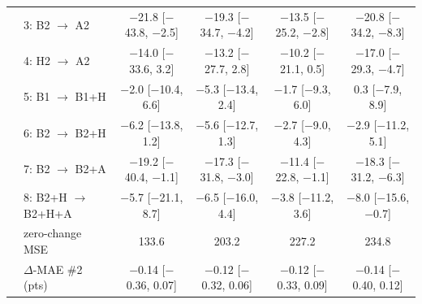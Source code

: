 \documentclass{article}
\newcommand{\cto}{$\rightarrow$}
\begin{document}
\begin{table}[h]
{\begin{tabular}{llcccc}
 & 3: B2 \cto{} A2 & $-$21.8 [$-$43.8, $-$2.5] & $-$19.3 [$-$34.7, $-$4.2] & $-$13.5 [$-$25.2, $-$2.8] & $-$20.8 [$-$34.2, $-$8.3] \\
 & 4: H2 \cto{} A2 & $-$14.0 [$-$33.6, 3.2] & $-$13.2 [$-$27.7, 2.8] & $-$10.2 [$-$21.1, 0.5] & $-$17.0 [$-$29.3, $-$4.7] \\
 & 5: B1 \cto{} B1+H & $-$2.0 [$-$10.4, 6.6] & $-$5.3 [$-$13.4, 2.4] & $-$1.7 [$-$9.3, 6.0] & 0.3 [$-$7.9, 8.9] \\
 & 6: B2 \cto{} B2+H & $-$6.2 [$-$13.8, 1.2] & $-$5.6 [$-$12.7, 1.3] & $-$2.7 [$-$9.0, 4.3] & $-$2.9 [$-$11.2, 5.1] \\
 & 7: B2 \cto{} B2+A & $-$19.2 [$-$40.4, $-$1.1] & $-$17.3 [$-$31.8, $-$3.0] & $-$11.4 [$-$22.8, $-$1.1] & $-$18.3 [$-$31.2, $-$6.3] \\
 & 8: B2+H \cto{} B2+H+A & $-$5.7 [$-$21.1, 8.7] & $-$6.5 [$-$16.0, 4.4] & $-$3.8 [$-$11.2, 3.6] & $-$8.0 [$-$15.6, $-$0.7] \\
 & zero-change MSE & 133.6 & 203.2 & 227.2 & 234.8 \\
 & $\Delta$-MAE \#2 (pts) & $-$0.14 [$-$0.36, 0.07] & $-$0.12 [$-$0.32, 0.06] & $-$0.12 [$-$0.33, 0.09] & $-$0.14 [$-$0.40, 0.12] \\
\bottomrule
\end{tabular}
}
\end{table}
\end{document}
